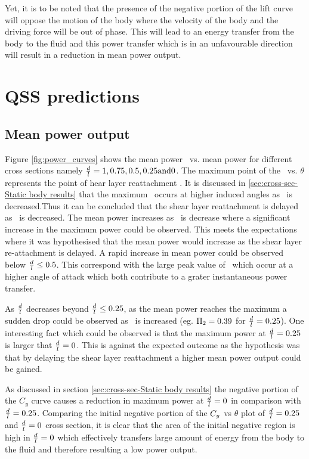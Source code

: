 Yet, it is to be noted that the presence of the negative portion of the lift curve will oppose the motion of the body where the velocity of the body and the driving force will be out of phase. This will lead to an energy transfer from the body to the fluid and this power transfer which is in an unfavourable direction will result in  a reduction in mean power output.

 \section{QSS predictions}
  \label{sec:cross-sec-QSS}
  
 \subsection{Mean power output}
 \label{subsec:cross-sec-qss-mean power}
 

 
Figure \ref{fig:power_curves} shows the mean power \massdamp\ vs. mean power for different cross sections namely $\frac{d}{l}=1,0.75,0.5,0.25 \text{and} 0$. The maximum point of the \cy\ vs. $\theta$ represents the point of hear layer reattachment \citep{Luo1994}. It is discussed in \ref{sec:cross-sec-Static body results} that the maximum \cy\ occurs at higher induced angles as \ratio\ is decreased.Thus it can be concluded that the shear layer reattachment is delayed as \ratio\ is decreased. The mean power increases as \ratio\ is decrease where a significant increase in the maximum power could be observed. This meets the expectations where it was hypothesised that the mean power would increase as the shear layer re-attachment is delayed. A rapid increase in mean power could be observed below $\frac{d}{l}\leq0.5$. This correspond with the large peak value of \cy\ which occur at a higher angle of attack which both contribute to a grater instantaneous power transfer. 

As $\frac{d}{l}$  decreases beyond $\frac{d}{l}\leq0.25$, as the mean power reaches the maximum a sudden drop could be observed as \massdamp\ is increased (eg. $\Pi_2=0.39$ for $\frac{d}{l}=0.25$). One interesting fact which could be observed is that the maximum power at $\frac{d}{l}=0.25$ is larger that $\frac{d}{l}=0$. This is against the expected outcome as the hypothesis was that by delaying the shear layer reattachment a higher mean power output could be gained.

As discussed in section \ref{sec:cross-sec-Static body results} the negative portion of the $C_y$ curve causes a reduction in maximum power at $\frac{d}{l}=0$ in comparison with $\frac{d}{l}=0.25$. Comparing  the initial negative portion of the $C_{y}$ vs $\theta$ plot of $\frac{d}{l}=0.25$ and $\frac{d}{l}=0$ cross section, it is clear that the area of the initial negative region is high in $\frac{d}{l}=0$ which effectively transfers large amount of energy from the body to the fluid and therefore resulting a low power output.  


